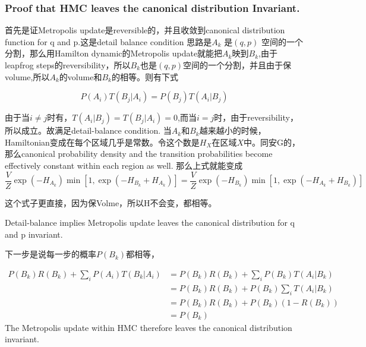 \documentclass[
]{book}
\theoremstyle{definition}
\theoremstyle{definition}
\theoremstyle{definition}
\theoremstyle{remark}
\begin{document}
\hypertarget{proof-that-hmc-leaves-the-canonical-distribution-invariant.}{%
\subsubsection{Proof that HMC leaves the canonical distribution Invariant.}\label{proof-that-hmc-leaves-the-canonical-distribution-invariant.}}

首先是证Metropolis update是reversible的，并且收敛到canonical distribution function for q and p.这是detail balance condition
思路是\(A_k\) 是\((q,p)\) 空间的一个分割，那么用Hamilton dynamic的Metropolis update就能把\(A_k\)映到\(B_k\),由于leapfrog steps的reversibility，所以\(B_k\)也是\((q,p)\)空间的一个分割，并且由于保volume,所以\(A_k\)的volume和\(B_k\)的相等。则有下式

\[
P\left(A_{i}\right) T\left(B_{j} | A_{i}\right)=P\left(B_{j}\right) T\left(A_{i} | B_{j}\right)
\]

由于当\(i\neq j\)时有，\(T\left(A_{i} | B_{j}\right)=T\left(B_{j} | A_{i}\right)=0\),而当\(i=j\)时，由于reversibility，所以成立。故满足detail-balance condition.
当\(A_k\)和\(B_k\)越来越小的时候，Hamiltonian变成在每个区域几乎是常数。令这个数是\(H_X\)在区域\(X\)中。同安G的，那么canonical probability density and the transition probabilities become effectively constant within each region as well.
那么上式就能变成
\[
\frac{V}{Z} \exp \left(-H_{A_{k}}\right) \min \left[1, \exp \left(-H_{B_{k}}+H_{A_{k}}\right)\right]=\frac{V}{Z} \exp \left(-H_{B_{k}}\right) \min \left[1, \exp \left(-H_{A_{k}}+H_{B_{k}}\right)\right]
\]

这个式子更直接，因为保Volme，所以H不会变，都相等。

Detail-balance implies Metropolis update leaves the canonical distribution for q and p invariant.

下一步是说每一步的概率\(P({B_k})\)都相等，

\[
\begin{aligned} P\left(B_{k}\right) R\left(B_{k}\right)+\sum_{i} P\left(A_{i}\right) T\left(B_{k} | A_{i}\right) &=P\left(B_{k}\right) R\left(B_{k}\right)+\sum_{i} P\left(B_{k}\right) T\left(A_{i} | B_{k}\right) \\ &=P\left(B_{k}\right) R\left(B_{k}\right)+P\left(B_{k}\right) \sum_{i} T\left(A_{i} | B_{k}\right) \\ &=P\left(B_{k}\right) R\left(B_{k}\right)+P\left(B_{k}\right)\left(1-R\left(B_{k}\right)\right) \\ &=P\left(B_{k}\right) \end{aligned}
\]
The Metropolis update within HMC therefore leaves the canonical distribution invariant.
\end{document}

